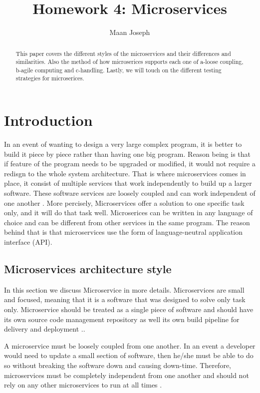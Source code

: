 \documentclass{IEEEtran}
\title{Homework 4: Microservices}
\author{Maan Joseph}
\begin{document}
	\maketitle
	\begin{abstract}
		This paper covers the different styles of the microservices and their differences and similarities. Also the method of how microserices supports each one of a-loose coupling, b-agile computing and c-handling. Lastly, we will touch on the different testing strategies for microserices.   
	\end{abstract}

	\section{Introduction}
		In an event of wanting to design a very large complex program, it is better to build it piece by piece rather than having one big program. Reason being is that if feature of the program needs to be upgraded or modified, it would not require a redisgn to the whole system architecture. That is where microservices comes in place, it consist of multiple services that work independently to build up a larger software. These software services are loosely coupled and can work independent of one another \cite{ibmred}. More percisely, Microservices offer a solution to one specific task only, and it will do that task well. Microserices can be written in any language of choice and can be different from other services in the same program. The reason behind that is that microservices use the form of language-neutral application interface (API).


		\subsection{Microservices architecture style}
			In this section we discuss Microservice in more details. Microservices are small and focused, meaning that it is a software that was designed to solve only task only. Microservice should be treated as a single piece of software and should have its own source code management repository as well its own build pipeline for delivery and deployment \cite{ibmred}..
			\newline
			
			
			A microservice must be loosely coupled from one another. In an event a developer would need to update a small section of software, then he/she must be able to do so without breaking the software down and causing down-time. Therefore, microservices must be completely independent from one another and should not rely on any other microservices to run at all times \cite{ibmred}.
			\newline
			
\end{document}
